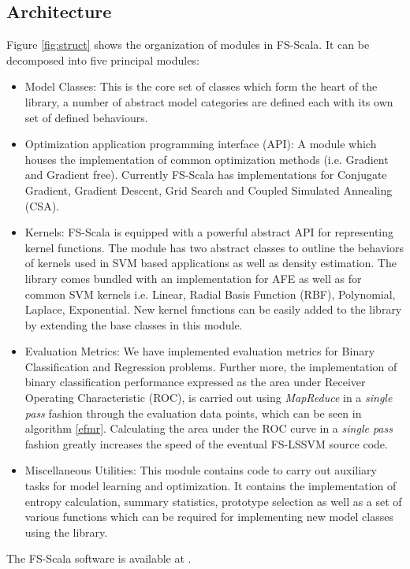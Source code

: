 \subsection*{Architecture}
Figure \ref{fig:struct} shows the organization of modules in FS-Scala. It can be decomposed into five principal modules:
\begin{itemize}
\item Model Classes:
This is the core set of classes which form the heart of the library, a number of abstract model categories are defined each with its own set of defined behaviours. 
\item Optimization application programming interface (API):
A module which houses the implementation of common optimization methods (i.e. Gradient and Gradient free). Currently FS-Scala has implementations for Conjugate Gradient, Gradient Descent, Grid Search and Coupled Simulated Annealing \cite{Xavier-De-Souza2010} (CSA). 
\item Kernels:
FS-Scala is equipped with a powerful abstract API for representing kernel functions. The module has two abstract classes to outline the behaviors of kernels used in SVM based applications as well as density estimation. The library comes bundled with an implementation for AFE as well as for common SVM kernels i.e. Linear, Radial Basis Function (RBF), Polynomial, Laplace, Exponential. New kernel functions can be easily added to the library by extending the base classes in this module.
\item Evaluation Metrics:
We have implemented evaluation metrics for Binary Classification and Regression problems. Further more, the implementation of binary classification performance expressed as the area under Receiver Operating Characteristic (ROC), is carried out using \textit{MapReduce} in a \textit{single pass} fashion through the evaluation data points, which can be seen in algorithm \ref{efmr}. Calculating the area under the ROC curve in a \textit{single pass} fashion greatly increases the speed of the eventual FS-LSSVM source code.
\item Miscellaneous Utilities:
This module contains code to carry out auxiliary tasks for model learning and optimization. It contains the implementation of entropy calculation, summary statistics, prototype selection as well as a set of various functions which can be required for implementing new model classes using the library.  

\end{itemize}

The FS-Scala software is available at \cite{fsscala}.



